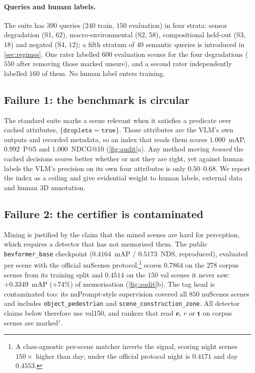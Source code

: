 \documentclass[10pt,twocolumn,letterpaper]{article}
\newcommand{\cont}{$^{\dagger}$}
\begin{document}
\paragraph{Queries and human labels.} The suite has $390$ queries ($240$ train,
$150$ evaluation) in four strata: sensor degradation (S1, $62$), macro-environmental
(S2, $58$), compositional held-out (S3, $18$) and negated (S4, $12$); a fifth stratum
of $40$ semantic queries is introduced in \cref{sec:regimes}. One rater labelled
$600$ evaluation scenes for the four degradations ($550$ after removing those marked
unsure), and a second rater independently labelled $160$ of them. No human label
enters training.

\subsection{Failure 1: the benchmark is circular}
\label{sec:d1}
The standard suite marks a scene relevant when it satisfies a predicate over cached
attributes, \eg $\{\texttt{droplets}{=}\texttt{true}\}$. Those attributes are the
VLM's own outputs and recorded metadata, so an index that reads them scores
$1.000$~mAP, $0.992$~P@5 and $1.000$~NDCG@10 (\cref{fig:audit}a). Any method moving
\emph{toward} the cached decisions scores better whether or not they are right, yet
against human labels the VLM's precision on its own four attributes is only
$0.50$--$0.68$. We report the index as a ceiling and give evidential weight to human
labels, external data and human 3D annotation.

\subsection{Failure 2: the certifier is contaminated}
\label{sec:d2}
Mining is justified by the claim that the mined scenes are hard for perception,
which requires a detector that has not memorised them. The public
\texttt{bevformer\_base} checkpoint ($0.4164$~mAP / $0.5173$~NDS, reproduced),
evaluated per scene with the official nuScenes
protocol,\footnote{A class-agnostic per-scene matcher inverts the signal, scoring
night scenes $150\times$ higher than day; under the official protocol night is
$0.4171$ and day $0.4553$.} scores $0.7864$ on the $278$ corpus scenes from its
training split and $0.4514$ on the $150$ val scenes it never saw: $+0.3349$~mAP
($+74\%$) of memorisation (\cref{fig:audit}b). The tag head is contaminated too: its
nuPrompt-style supervision covered all $850$ nuScenes scenes and includes
\texttt{object\_pedestrian} and \texttt{scene\_construction\_zone}. All detector
claims below therefore use val150, and rankers that read $\mathbf{e}$, $r$ or
$\mathbf{t}$ on corpus scenes are marked\cont.
\end{document}
